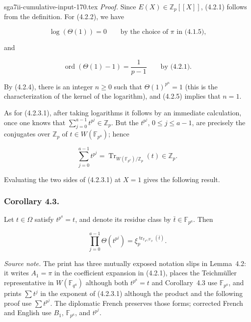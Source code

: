 \begin{filecontents*}{sga7ii-cumulative-input-170.tex}
\medskip
\noindent\emph{Proof.}
Since $E(X)\in\mathbb Z_p[[X]]$, (4.2.1) follows from the definition. For
(4.2.2), we have

\begin{equation}\tag{4.2.4}
\log(\Theta(1))=0
\qquad\text{by the choice of $\pi$ in (4.1.5),}
\end{equation}

and

\begin{equation}\tag{4.2.5}
\operatorname{ord}(\Theta(1)-1)=\frac1{p-1}
\qquad\text{by (4.2.1).}
\end{equation}

By (4.2.4), there is an integer $n\geq0$ such that
$\Theta(1)^{p^n}=1$ (this is the characterization of the kernel of the
logarithm), and (4.2.5) implies that $n=1$.

As for (4.2.3.1), after taking logarithms it follows by an immediate
calculation, once one knows that
$\sum_{j=0}^{a-1}t^{p^j}\in\mathbb Z_p$. But the $t^{p^j}$,
$0\leq j\leq a-1$, are precisely the conjugates over $\mathbb Z_p$ of
$t\in W(\mathbb F_{p^a})$; hence

\[
\sum_{j=0}^{a-1}t^{p^j}
=\operatorname{Tr}_{W(\mathbb F_{p^a})/\mathbb Z_p}(t)\in\mathbb Z_p.
\]

Evaluating the two sides of (4.2.3.1) at $X=1$ gives the following result.

\subsubsection*{Corollary 4.3.}
Let $t\in\Omega$ satisfy $t^{p^a}=t$, and denote its residue class by
$\bar t\in\mathbb F_{p^a}$. Then

\begin{equation}\tag{4.3.1}
\prod_{j=0}^{a-1}\Theta(t^{p^j})
=\xi_p^{\operatorname{tr}_{\mathbb F_{p^a}/\mathbb F_p}(\bar t)}.
\end{equation}

\medskip
\noindent\emph{Source note.}
The print has three mutually exposed notation slips in Lemma~4.2: it writes
$A_1=\pi$ in the coefficient expansion in (4.2.1), places the Teichmüller
representative in $W(\mathbb F_{q^a})$ although both $t^{p^a}=t$ and
Corollary~4.3 use $\mathbb F_{p^a}$, and prints $\sum t^j$ in the exponent
of (4.2.3.1) although the product and the following proof use
$\sum t^{p^j}$. The diplomatic French preserves those forms; corrected
French and English use $B_1$, $\mathbb F_{p^a}$, and $t^{p^j}$.
\end{filecontents*}
